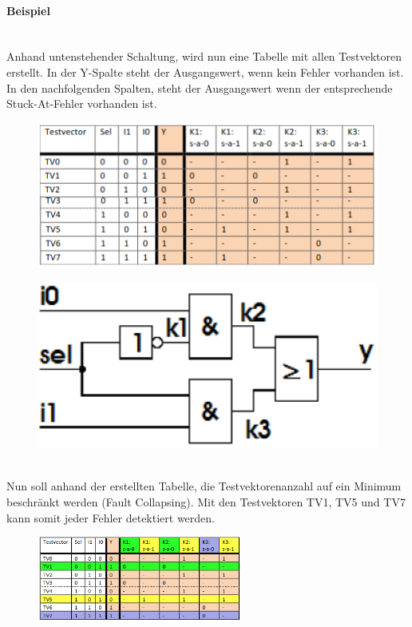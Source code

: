 \paragraph{Beispiel}$~$ \\
Anhand untenstehender Schaltung, wird nun eine Tabelle mit allen Testvektoren erstellt. In der Y-Spalte steht der Ausgangswert, wenn kein Fehler vorhanden ist. In den nachfolgenden Spalten, steht der Ausgangswert wenn der entsprechende Stuck-At-Fehler vorhanden ist.\ \\
\begin{minipage}{0.6\textwidth}
\begin{figure}[H]
    \includegraphics[width=1.0\textwidth]{images/stuckat_detektion_1.png}
\end{figure}
\end{minipage}
\hfill
\begin{minipage}{0.35\textwidth}
\begin{figure}[H]
    \includegraphics[width=1.0\textwidth]{images/stuckat_detektion_schaltung.png}
\end{figure}
\end{minipage} \\
Nun soll anhand der erstellten Tabelle, die Testvektorenanzahl auf ein Minimum beschränkt werden (Fault Collapsing). Mit den Testvektoren TV1, TV5 und TV7 kann somit jeder Fehler detektiert werden.
\begin{figure}[H]
    \includegraphics[width=0.6\textwidth]{images/stuckat_detektion_2.png}
\end{figure}

